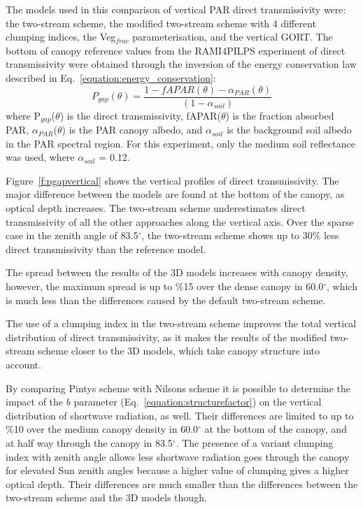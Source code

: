 \documentclass[a4paper,11pt]{report}
\begin{document}
The models used in this comparison of vertical PAR direct transmissivity were: the two-stream scheme, the modified two-stream scheme with 4 different clumping indices, the Veg$_{frac}$ parameterisation, and the vertical GORT. The bottom of canopy reference values from the RAMI4PILPS experiment of direct transmissivity were obtained through the inversion of the energy conservation law described in Eq.~\ref{equation:energy_conservation}:
 \begin{equation}
P_{gap}(\theta) = \frac{1 - fAPAR(\theta) - \alpha_{PAR}(\theta)}{(1 - \alpha_{soil})}
\label{equation:energy_conservation}
\end{equation}
\noindent where P$_{gap}$($\theta$) is the direct transmissivity, fAPAR($\theta$) is the fraction absorbed PAR, $\alpha_{PAR}$($\theta$) is the PAR canopy albedo, and $\alpha_{soil}$ is the background soil albedo in the PAR spectral region. For this experiment, only the medium soil reflectance was used, where $\alpha_{soil}$ = 0.12.

Figure~\ref{f:pgapvertical} shows the vertical profiles of direct transmissivity. The major difference between the models are found at the bottom of the canopy, as optical depth increases. The two-stream scheme underestimates direct transmissivity of all the other approaches along the vertical axis. Over the sparse case in the zenith angle of 83.5$^{\circ}$, the two-stream scheme shows up to 30\% less direct transmissivity than the reference model.

The spread between the results of the 3D models increases with canopy density, however, the maximum spread is up to \%15 over the dense canopy in 60.0$^{\circ}$, which is much less than the differences caused by the default two-stream scheme.

The use of a clumping index in the two-stream scheme improves the total vertical distribution of direct transmissivity, as it makes the results of the modified two-stream scheme closer to the 3D models, which take canopy structure into account.

By comparing Pinty\textquotesingle s scheme with Nilson\textquotesingle s scheme it is possible to determine the impact of the $b$ parameter (Eq.~\ref{equation:structurefactor}) on the vertical distribution of shortwave radiation, as well. Their differences are limited to up to \%10 over the medium canopy density in 60.0$^{\circ}$ at the bottom of the canopy, and at half way through the canopy in 83.5$^{\circ}$. The presence of a variant clumping index with zenith angle allows less shortwave radiation goes through the canopy for elevated Sun zenith angles because a higher value of clumping gives a higher optical depth. Their differences are much smaller than the differences between the two-stream scheme and the 3D models though.
\end{document}
